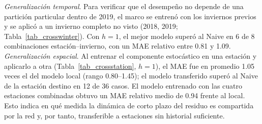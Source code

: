 \textit{Generalización temporal}. Para verificar que el desempeño no depende de una partición particular dentro de 2019, el marco se entrenó con los inviernos previos y se aplicó a un invierno completo no visto (2018, 2019; Tabla~\ref{tab_crosswinter}). Con $h=1$, el mejor modelo superó al Naive en 6 de 8 combinaciones estación--invierno, con un MAE relativo entre 0.81 y 1.09. \textit{Generalización espacial}. Al entrenar el componente estocástico en una estación y aplicarlo a otra (Tabla~\ref{tab_crossstation}, $h=1$), el MAE fue en promedio 1.05 veces el del modelo local (rango 0.80--1.45); el modelo transferido superó al Naive de la estación destino en 12 de 36 casos. El modelo entrenado con las cuatro estaciones combinadas obtuvo un MAE relativo medio de 0.94 frente al local. Esto indica en qué medida la dinámica de corto plazo del residuo es compartida por la red y, por tanto, transferible a estaciones sin historial suficiente.
